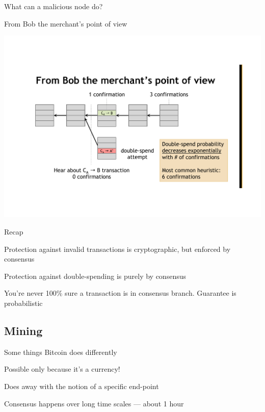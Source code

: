 \begin{frame}{What can a malicious node do?}

From Bob the merchant's point of view

\begin{center}
\includegraphics[width=\textwidth]{double2}
\end{center}


\end{frame}

\begin{frame}{Recap}

\BIL
\item Protection against invalid transactions is cryptographic, but enforced by consensus

\item Protection against double-spending is purely by consensus

\item You're never 100\% sure a transaction is in consensus branch. Guarantee is probabilistic
\EIL


\end{frame}

\subsection{Mining}

\begin{frame}{Some things Bitcoin does differently}
	
\BI
\item Possible only because it's a currency!
\EI

\BI
\item Does away with the notion of a specific end-point
\item Consensus happens over long time scales — about 1 hour
\EI

\end{frame}



